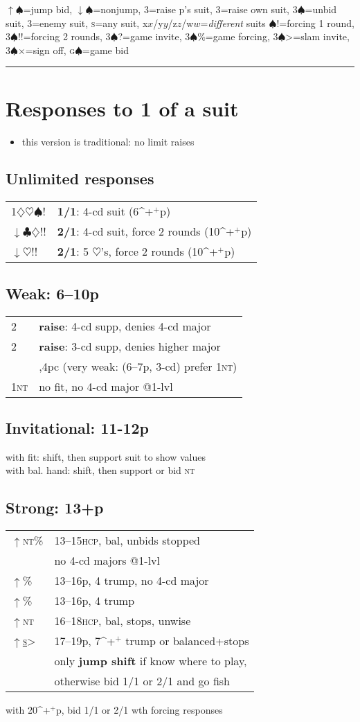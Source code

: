 \documentclass[landscape]{article}
\makeatletter
\def\udots{\bgroup \markoverwith{\lower3.2\p@\hbox{\kern-0.7\p@
  .\kern0\p@}}\ULon}
\newcommand{\optionalmath}[1]{\ifmmode#1\else$#1$\fi}
\def\+{\optionalmath{^+}}
\def\C{\optionalmath\clubsuit}
\def\D{\optionalmath\diamondsuit}
\def\H{\optionalmath\heartsuit}
\def\S{\optionalmath\spadesuit}
\def\NT{\ifmmode\mathsc{nt}\else\textsc{nt}\fi}
\def\HCP{\textsc{hcp}}
\def\s{\textsc{s}}
\def\game{\textsc{g}}
\def\x{\optionalmath x}
\def\y{\optionalmath y}
\def\z{\optionalmath z}
\def\w{\optionalmath w}
\def\li{\indent\phantom{li}}
\def\force{!}
\def\inv{?}
\def\si{>}
\def\so{\optionalmath\times}
\def\gf{\%}
\def\nojump{\optionalmath\downarrow}
\def\jump{\optionalmath\uparrow}
\def\setcc#1#2{\def\cc{\crunch[#1]}\def\cca{\crunch[#2]}}
\newcommand{\crunch}[1][.6]{\vspace*{-#1pc}}
\renewcommand{\bullet}[1]{\begin{itemize}\item#1\end{itemize}}
\def\unbid#1{\uline{#1}}
\def\raise#1{\uwave{#1}}
\def\rebid#1{\udots{#1}}
\def\cue#1{\begingroup\setbox0=\hbox{#1}\dimen0=\wd0\dimen1=\ht0\dimen2=\dp0%
\setbox1=\hbox{\fbox{\setbox2=\hbox{}%
\advance\dimen0 by -4pt \advance\dimen1 by -1pt \advance\dimen2 by -1pt%
\wd2=\dimen0\ht2=\dimen1\dp2=\dimen2\box2}}%
\wd1=0pt\ht1=0pt\dp1=0pt\box1\hskip1pt\box0\hskip3pt\endgroup}
\def\cue#1{\uuline{#1}}
\newenvironment{column}[1][0.33]{\begin{minipage}[t]{#1\columnwidth}}{\end{minipage}}
\newcommand{\legend}{{\center\noindent 
\jump3\S=jump bid, \nojump3\S=nonjump,
3\raise{\S}=raise p's suit, 3\rebid{\S}=raise own suit,
3\unbid{\S}=unbid suit, 3\cue{\S}=enemy suit, 
\s=any suit, \x/\y/\z/\w=\emph{different\/} suits}\vspace*{-9pt}
{\center3\S\force=forcing 1 round, 3\S\force\force=forcing 2 rounds,
3\S\inv=game invite, 3\S\gf=game forcing, 
3\S\si=slam invite, 3\S\so=sign off, \game\S=game bid
}\vspace*{4pt}\hrule\vspace*{4pt}}
\makeatother
\begin{document}
\legend
\begin{column}\setcc{.6}{.4}
\section{Responses to 1 of a suit}
\crunch\bullet{this version is traditional: no limit raises}\crunch[1.7]
\subsection{Unlimited responses}\cca
\begin{tabular}{ll}
  1\unbid{\D\H\S}\force & \textbf{1/1}: 4-cd suit (6\+p)\\
  \nojump2\unbid{\C\D}\force\force & \textbf{2/1}: 4-cd suit, force 2 rounds (10\+p)\\
  \nojump2\unbid{\H}\force\force & \textbf{2/1}: 5 \H's, force 2 rounds (10\+p)\\
\end{tabular}

\cc\subsection{Weak: 6--10p}\cca
\begin{tabular}{ll}
  2\raise{\C\D} & \textbf{raise}: 4-cd supp, denies 4-cd major\\
  2\raise{\H\S} & \textbf{raise}: 3-cd supp, denies higher major\\
              & \hskip-2,4pc (very weak: (6--7p, 3-cd) prefer 1\NT)\\
  1\NT        & no fit, no 4-cd major @1-lvl\\
\end{tabular}

\cc\subsection{Invitational: 11-12p}\cca
\li with fit: shift, then support suit to show values\\
\li with bal. hand: shift, then support or bid \NT

\cc\subsection{Strong: 13+p}\cca
\begin{tabular}{ll}
  \jump2\NT\gf & 13--15\HCP, bal, unbids stopped\\
               & no 4-cd majors @1-lvl\\
  \jump3\raise{\C\D}\gf & 13--16p, 4 trump, no 4-cd major\\
  \jump3\raise{\H\S}\gf & 13--16p, 4 trump\\
  \jump3\NT & 16--18\HCP, bal, stops, unwise\\
  \jump\unbid{\s}\si & 17--19p, 7\+ trump or balanced+stops\\
                     & \hskip-2pc only \textbf{jump shift} if know where to play,\\
                     & \hskip-2pc otherwise bid 1/1 or 2/1 and go fish\\
\end{tabular}
\li with 20\+p, bid 1/1 or 2/1 wth forcing responses


\end{column}
\end{document}
